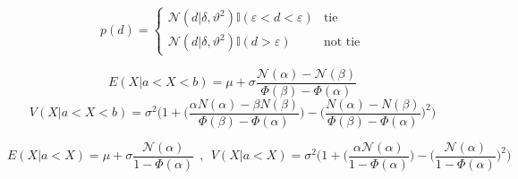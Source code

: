 \documentclass[article]{jss}
\newif\ifen
\newif\ifes
\newcommand{\en}[1]{\ifen#1\fi}
\newcommand{\es}[1]{\ifes#1\fi}
\newcommand{\N}{\mathcal{N}}
\begin{document}
%
\en{Remember that \texttt{teams}, \texttt{results}, and \texttt{p\_draw}, were defined in Code \ref{lst:game} and \ref{lst:draw}.}
\es{Recuerden que \texttt{teams}, \texttt{results}, y \texttt{p\_draw}, fueron definidas en los c\'odigos \ref{lst:game} y \ref{lst:draw}.}


\en{The need to approximate the posterior occurs because the probability distribution of the difference is a truncated Gasussian (Eq.~\ref{eq:p_d}).}
\es{La necesidad de aproximar el posterior ocurre debido a que la distribuci\'on de probabilidad de la diferencia es una Gasussian truncada (Eq.~\ref{eq:p_d}).}
%
\begin{equation}\label{eq:p_d}
p(d) =
\begin{cases}
\N(d|\delta,\vartheta^2) \mathbb{I}(\varepsilon < d < \varepsilon) & \text{tie} \\
\N(d|\delta,\vartheta^2) \mathbb{I}(d > \varepsilon) & \text{not tie}
\end{cases}
\end{equation}
%
\en{For Gaussian distributions, moment matching is known to minimize the Kullback-Leibler divergence~\citep{Herbrich2007}.}
\es{Se sabe que las distribuciones gaussianas que minimizan la divergencia Kullback-Libler son las que tiene mismo momentos~\citep{Herbrich2007}.}
%
\en{The expectation and variance of a truncated Gaussian $\N(x|\mu,\sigma^2)$ in a $[a,b]$ interval are,}
\es{La esperanza y la varianza de una gaussiana truncada $\N(x|\mu,\sigma^2)$ en un intervalo $[a,b]$ son,}
%
\begin{equation}\label{eq:mean_aprox_double}
 E(X| a < X < b) = \mu + \sigma \frac{\N(\alpha) - \N(\beta) }{\Phi(\beta) - \Phi(\alpha) }
\end{equation}
%
\begin{equation}\label{eq:variance_aprox_double}
 V(X| a < X < b) = \sigma^2 \Bigg( 1 + \bigg(\frac{\alpha N(\alpha) - \beta N(\beta) }{\Phi(\beta) - \Phi(\alpha) }\bigg) - \bigg(\frac{N(\alpha) - N(\beta) }{\Phi(\beta) - \Phi(\alpha) }\bigg)^2 \Bigg)
\end{equation}
%
\en{where $\beta = \frac{b-\mu}{\sigma}$ and $\alpha = \frac{a-\mu}{\sigma}$.}
\es{donde $\beta = \frac{b-\mu}{\sigma}$ y $\alpha = \frac{a-\mu}{\sigma}$.}
%
\en{With a single-sided truncation, these functions can be simplified as,}
\es{Con un \'unico truncamiento, estas funciones se pueden simplificar como,}
%
\begin{equation*}
 E(X| a < X )   =  \mu + \sigma \frac{\N(\alpha)}{1 - \Phi(\alpha) } \ \ , \ \ V(X| a < X )  = \sigma^2 \Bigg( 1 + \bigg(\frac{\alpha \N(\alpha)}{1 - \Phi(\alpha) }\bigg) - \bigg(\frac{\N(\alpha)}{1 - \Phi(\alpha) }\bigg)^2 \Bigg) 
\end{equation*}
\end{document}
